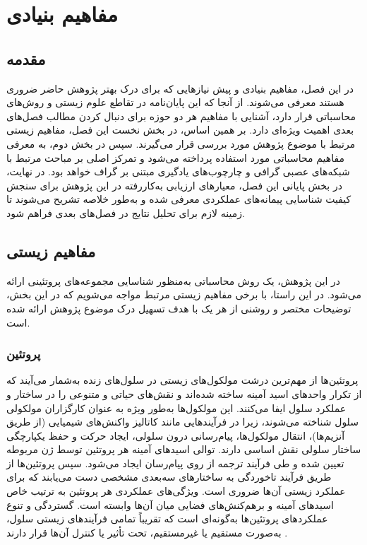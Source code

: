 \chapter{مفاهیم بنیادی}

\section{مقدمه}
در این فصل، مفاهیم بنیادی و پیش ‌نیازهایی که برای درک بهتر پژوهش حاضر ضروری هستند معرفی می‌شوند. از آنجا که این پایان‌نامه در تقاطع علوم زیستی و روش‌های محاسباتی قرار دارد، آشنایی با مفاهیم هر دو حوزه برای دنبال ‌کردن مطالب فصل‌های بعدی اهمیت ویژه‌ای دارد.
بر همین اساس، در بخش نخست این فصل، مفاهیم زیستی مرتبط با موضوع پژوهش مورد بررسی قرار می‌گیرند. سپس در بخش دوم، به معرفی مفاهیم محاسباتی مورد استفاده پرداخته می‌شود و تمرکز اصلی بر مباحث مرتبط با شبکه‌های عصبی گرافی و چارچوب‌های یادگیری مبتنی بر گراف خواهد بود.
در نهایت، در بخش پایانی این فصل، معیارهای ارزیابی به‌کاررفته در این پژوهش برای سنجش کیفیت شناسایی پیمانه‌های عملکردی معرفی شده و به‌طور خلاصه تشریح می‌شوند تا زمینه لازم برای تحلیل نتایج در فصل‌های بعدی فراهم شود.

\section{مفاهیم زیستی}
در این پژوهش، یک روش محاسباتی به‌منظور شناسایی مجموعه‌های پروتئینی ارائه می‌شود. در این راستا، با برخی مفاهیم زیستی مرتبط مواجه می‌شویم که در این بخش، توضیحات مختصر و روشنی از هر یک با هدف تسهیل درک موضوع پژوهش ارائه شده است.
\subsection{پروتئین}
پروتئین‌ها از مهم‌ترین  درشت مولکول‌های زیستی در سلول‌های زنده به‌شمار می‌آیند که از تکرار واحدهای اسید آمینه ساخته شده‌اند و نقش‌های حیاتی و متنوعی را در ساختار و عملکرد سلول ایفا می‌کنند. این مولکول‌ها به‌طور ویژه به‌ عنوان کارگزاران مولکولی سلول شناخته می‌شوند، زیرا در فرآیندهایی مانند کاتالیز واکنش‌های شیمیایی (از طریق آنزیم‌ها)، انتقال مولکول‌ها، پیام‌رسانی درون ‌سلولی، ایجاد حرکت و حفظ یکپارچگی ساختار سلولی نقش اساسی دارند. توالی اسیدهای آمینه هر پروتئین توسط ژن مربوطه تعیین شده و طی فرآیند ترجمه از روی  پیام‌رسان  ایجاد می‌شود. سپس پروتئین‌ها از طریق فرآیند تاخوردگی به ساختارهای سه‌بعدی مشخصی دست می‌یابند که برای عملکرد زیستی آن‌ها ضروری است. ویژگی‌های عملکردی هر پروتئین به ترتیب خاص اسیدهای آمینه و برهم‌کنش‌های فضایی میان آن‌ها وابسته است. گستردگی و تنوع عملکردهای پروتئین‌ها به‌گونه‌ای است که تقریباً تمامی فرآیندهای زیستی سلول، به‌صورت مستقیم یا غیرمستقیم، تحت تأثیر یا کنترل آن‌ها قرار دارند \cite{Alberts2022MBC}.

